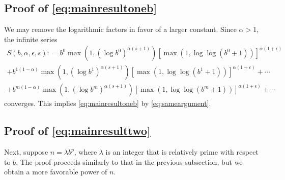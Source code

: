 \documentclass[authoryear]{elsarticle}
\begin{document}
\subsection{Proof of \eqref{eq:mainresultoneb}}  We may remove the logarithmic factors in favor of a larger constant.  Since $\alpha > 1$, the infinite series 
\begin{multline} \label{eq:infseries}
    S(b, \alpha, \epsilon, s) : = b^{0}\max(1, (\log b^{0})^{\alpha(s+1)}) [\max(1,\log \log (
    b^{0}+1))]^{\alpha(1+\epsilon)} \\
    + b^{1(1-\alpha)}\max(1, (\log b^{1})^{\alpha(s+1)}) [\max(1,\log \log (
    b^{1}+1))]^{\alpha(1+\epsilon)}
    + \cdots \\
    + b^{m(1-\alpha)}\max(1, (\log b^{m})^{\alpha(s+1)}) [\max(1,\log \log (
    b^m+1))]^{\alpha(1+\epsilon)} + \cdots 
\end{multline}
converges.  This implies \eqref{eq:mainresultoneb} by \eqref{eq:sameargument}.

\subsection{Proof of \eqref{eq:mainresulttwo}}
Next, suppose $n = \lambda b^p$, where $\lambda$ is an integer that is relatively prime with respect to $b$.  The proof proceeds similarly to that in the previous subsection, but we obtain a more favorable power of $n$.
\end{document}
